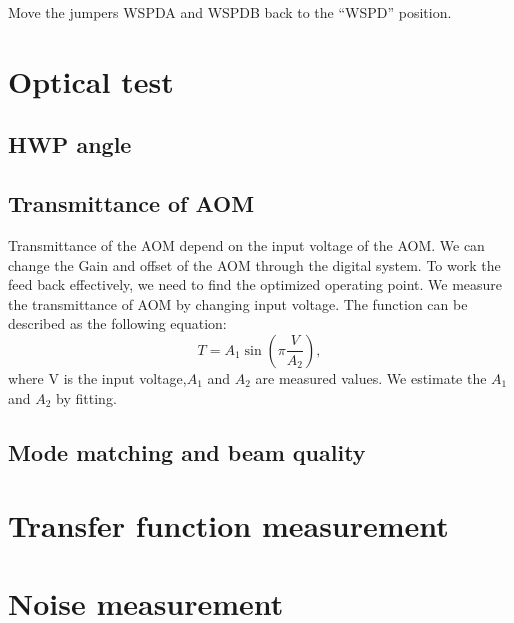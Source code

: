 \begin{enumerate}
\begin{enumerate}
		\begin{center}
		\end{center}
		Move the jumpers WSPDA and WSPDB back to the “WSPD” position.
	\end{enumerate}
\end{enumerate}
\section{Optical test}
\subsection{HWP angle}
\subsection{Transmittance of AOM}
Transmittance of the AOM depend on the input voltage of the AOM. We can change the Gain and offset of the AOM through the digital system. To work the feed back effectively, we need to find the optimized operating point. We measure the transmittance of AOM by changing input voltage. The function can be described as the following equation:
\begin{equation}
T=A_1 \sin{\left( \pi \frac{V}{A_2}\right)},
\end{equation}
where V is the input voltage,$ A_1$ and $A_2$ are measured values. We estimate the $A_1$ and $A_2$ by fitting.
\subsection{Mode matching and beam quality}
\section{Transfer function measurement}
\section{Noise measurement}

